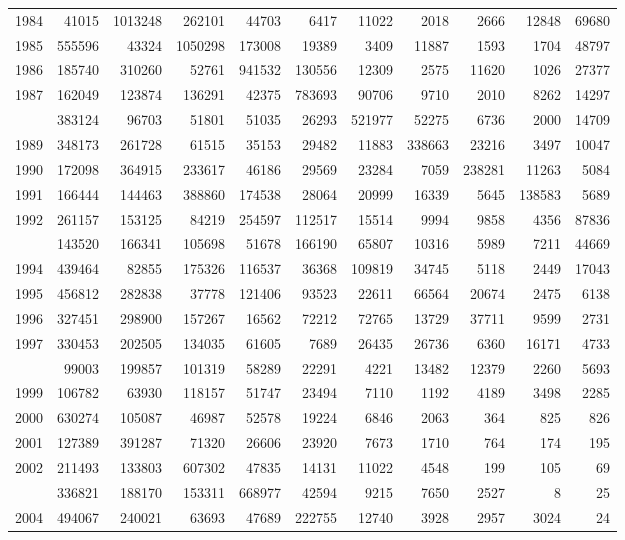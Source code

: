 \documentclass[
]{article}
\begin{document}
\begin{longtable}[t]{lrrrrrrrrrr}
1984 & 41015 & 1013248 & 262101 & 44703 & 6417 & 11022 & 2018 & 2666 & 12848 & 69680\\
1985 & 555596 & 43324 & 1050298 & 173008 & 19389 & 3409 & 11887 & 1593 & 1704 & 48797\\
1986 & 185740 & 310260 & 52761 & 941532 & 130556 & 12309 & 2575 & 11620 & 1026 & 27377\\
1987 & 162049 & 123874 & 136291 & 42375 & 783693 & 90706 & 9710 & 2010 & 8262 & 14297\\
\addlinespace
1988 & 383124 & 96703 & 51801 & 51035 & 26293 & 521977 & 52275 & 6736 & 2000 & 14709\\
1989 & 348173 & 261728 & 61515 & 35153 & 29482 & 11883 & 338663 & 23216 & 3497 & 10047\\
1990 & 172098 & 364915 & 233617 & 46186 & 29569 & 23284 & 7059 & 238281 & 11263 & 5084\\
1991 & 166444 & 144463 & 388860 & 174538 & 28064 & 20999 & 16339 & 5645 & 138583 & 5689\\
1992 & 261157 & 153125 & 84219 & 254597 & 112517 & 15514 & 9994 & 9858 & 4356 & 87836\\
\addlinespace
1993 & 143520 & 166341 & 105698 & 51678 & 166190 & 65807 & 10316 & 5989 & 7211 & 44669\\
1994 & 439464 & 82855 & 175326 & 116537 & 36368 & 109819 & 34745 & 5118 & 2449 & 17043\\
1995 & 456812 & 282838 & 37778 & 121406 & 93523 & 22611 & 66564 & 20674 & 2475 & 6138\\
1996 & 327451 & 298900 & 157267 & 16562 & 72212 & 72765 & 13729 & 37711 & 9599 & 2731\\
1997 & 330453 & 202505 & 134035 & 61605 & 7689 & 26435 & 26736 & 6360 & 16171 & 4733\\
\addlinespace
1998 & 99003 & 199857 & 101319 & 58289 & 22291 & 4221 & 13482 & 12379 & 2260 & 5693\\
1999 & 106782 & 63930 & 118157 & 51747 & 23494 & 7110 & 1192 & 4189 & 3498 & 2285\\
2000 & 630274 & 105087 & 46987 & 52578 & 19224 & 6846 & 2063 & 364 & 825 & 826\\
2001 & 127389 & 391287 & 71320 & 26606 & 23920 & 7673 & 1710 & 764 & 174 & 195\\
2002 & 211493 & 133803 & 607302 & 47835 & 14131 & 11022 & 4548 & 199 & 105 & 69\\
\addlinespace
2003 & 336821 & 188170 & 153311 & 668977 & 42594 & 9215 & 7650 & 2527 & 8 & 25\\
2004 & 494067 & 240021 & 63693 & 47689 & 222755 & 12740 & 3928 & 2957 & 3024 & 24\\

\end{longtable}
\end{document}
